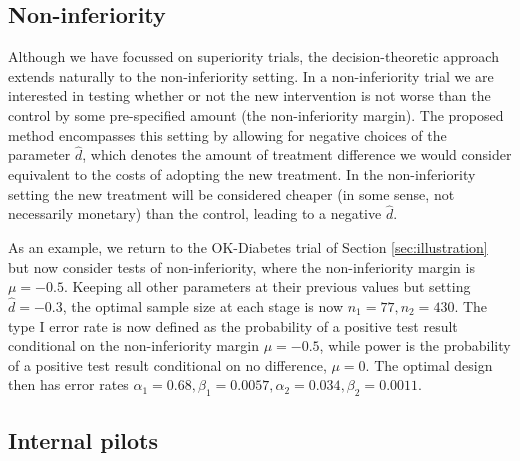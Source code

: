 \documentclass[sagev, Crown]{sagej} %
\begin{document}
\subsection{Non-inferiority}

Although we have focussed on superiority trials, the decision-theoretic approach extends naturally to the non-inferiority setting. In a non-inferiority trial we are interested in testing whether or not the new intervention is not worse than the control by some pre-specified amount (the non-inferiority margin). The proposed method encompasses this setting by allowing for negative choices of the parameter $\hat{d}$, which denotes the amount of treatment difference we would consider equivalent to the costs of adopting the new treatment. In the non-inferiority setting the new treatment will be considered cheaper (in some sense, not necessarily monetary) than the control, leading to a negative $\hat{d}$.

As an example, we return to the OK-Diabetes trial of Section \ref{sec:illustration} but now consider tests of non-inferiority, where the non-inferiority margin is $\mu = -0.5$. Keeping all other parameters at their previous values but setting $\hat{d} = -0.3$, the optimal sample size at each stage is now $n_1 = 77, n_2 = 430$. The type I error rate is now defined as the probability of a positive test result conditional on the non-inferiority margin $\mu = -0.5$, while power is the probability of a positive test result conditional on no difference, $\mu = 0$. The optimal design then has error rates $\alpha_1 = 0.68, \beta_1 = 0.0057, \alpha_2 = 0.034, \beta_2 = 0.0011$.

\subsection{Internal pilots}
\end{document}
